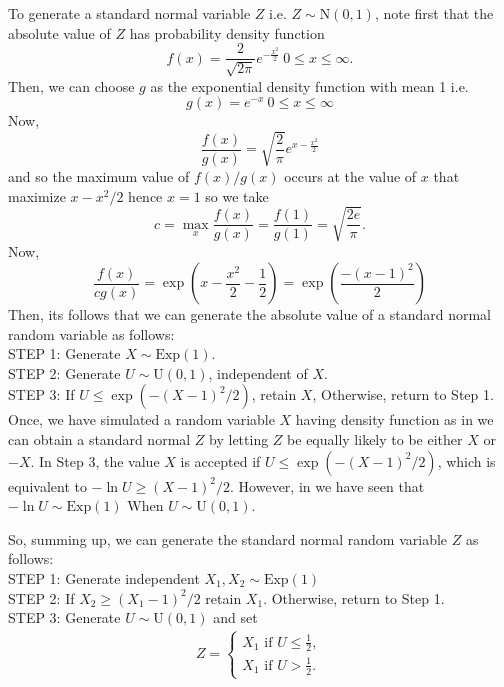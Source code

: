 \begin{example}
	\label{generate normal}
    To generate a standard normal variable $Z$ i.e. $Z\sim \text{N}(0,1)$, note first that the absolute value of  $Z$ has probability density function
	\begin{equation}
		\label{abs std normal}
		f(x) = \frac{2}{\sqrt{2\pi}}e^{- \frac{x^{2}}{2}} \ 0\le x \le \infty.
	\end{equation}
	Then, we can choose $g$ as the exponential density function with mean 1 i.e.
	\[
		g(x) = e^{-x}\ 0\le x\le \infty
	\]
	Now,
	\[
		\frac{f(x)}{g(x)} = \sqrt{\frac{2}{\pi}} e^{x-\frac{x^{2}}{2}}
	\]
	and so the maximum value of $f(x)/g(x)$ occurs at the value of $x$ that maximize $x-x^2 /2$ hence $x=1$ so we take
	\[
		c = \max_x \frac{f(x)}{g(x)} = \frac{f(1)}{g(1)} = \sqrt{\frac{2e}{\pi}}.
	\]
	Now,
	\[
		\frac{f(x)}{cg(x)} = \exp\left( x-\frac{x^2}{2}-\frac{1}{2} \right) = \exp\left( \frac{-(x-1)^2}{2} \right)
	\]
	Then, its follows that we can generate the absolute value of a standard normal random variable as follows: \\
    STEP 1: Generate $X\sim \text{Exp}(1)$. \\
    STEP 2: Generate $U\sim \text{U}(0,1)$, independent of $X$.\\
	STEP 3: If  $U\le \exp\left( -(X-1)^2 /2 \right)$, retain  $X$, Otherwise, return to Step 1.\\

	Once, we have simulated a random variable $X$ having density function as in
	 we can obtain a standard normal $Z$ by letting
	$Z$ be equally likely to be either  $X$ or  $-X$.
	In Step 3, the value $X$ is accepted if  $U\le \exp\left( -(X-1)^2 /2 \right)$, which is equivalent to $- \ln U\ge (X-1)^2 /2$.
    However, in  we have seen that $-\ln{U}\sim \text{Exp}(1)$ When $U\sim \text{U}(0,1)$.

	So, summing up, we can generate the standard normal random variable $Z$ as follows:\\
    STEP 1: Generate independent $X_1, X_2\sim \text{Exp}(1) $\\
	STEP 2: If $X_2\ge (X_1-1)^2 /2$ retain $X_1$. Otherwise, return to Step 1.\\
    STEP 3: Generate $U\sim \text{U}(0,1)$ and set
	\begin{eqnarray*}
		Z=
		\begin{cases}
			X_1 \text{ if } U\le \frac{1}{2}, \\
			X_1 \text{ if } U> \frac{1}{2}.
		\end{cases}
	\end{eqnarray*}


\end{example}
